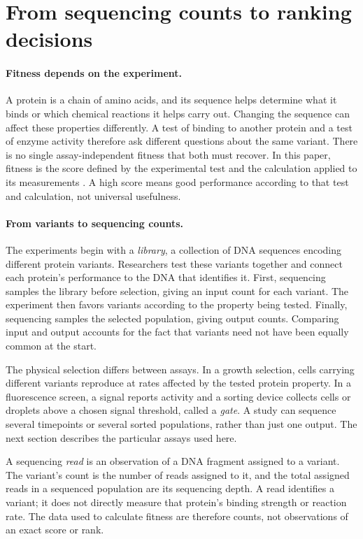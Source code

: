\documentclass[11pt]{article}
\begin{document}
\section{From sequencing counts to ranking decisions}
\label{sec:background}

\paragraph{Fitness depends on the experiment.}
A protein is a chain of amino acids, and its sequence helps determine what
it binds or which chemical reactions it helps carry out. Changing the sequence
can affect these properties differently. A test of binding to another protein
and a test of enzyme activity therefore ask different questions about the
same variant. There is no single assay-independent fitness that both must
recover. In this paper, fitness is the score defined by the experimental
test and the calculation applied to its measurements
\citep{fowler2014,johnston2024}. A high score means good performance according
to that test and calculation, not universal usefulness.

\paragraph{From variants to sequencing counts.}
The experiments begin with a \emph{library}, a collection of DNA sequences
encoding different protein variants. Researchers test these variants together
and connect each protein's performance to the DNA that identifies it.
First, sequencing samples the library before selection, giving an input
count for each variant. The experiment then favors variants according to
the property being tested. Finally, sequencing samples the selected population,
giving output counts. Comparing input and output accounts for the fact that
variants need not have been equally common at the start.

The physical selection differs between assays. In a growth selection, cells
carrying different variants reproduce at rates affected by the tested protein
property. In a fluorescence screen, a signal reports activity and a sorting
device collects cells or droplets above a chosen signal threshold, called
a \emph{gate}. A study can sequence several timepoints or several sorted
populations, rather than just one output. The next section describes the
particular assays used here.

A sequencing \emph{read} is an observation of a DNA fragment assigned to
a variant. The variant's count is the number of reads assigned to it, and
the total assigned reads in a sequenced population are its sequencing depth.
A read identifies a variant; it does not directly measure that protein's
binding strength or reaction rate. The data used to calculate fitness are
therefore counts, not observations of an exact score or rank.
\end{document}
